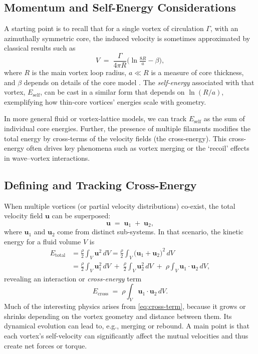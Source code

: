 \subsection{Momentum and Self-Energy Considerations}
\label{sec:momentum}
A starting point is to recall that for a single vortex of circulation $\Gamma$, with an
azimuthally symmetric core, the induced velocity is sometimes approximated by
classical results such as
\begin{equation}
   V \;=\; \frac{\Gamma}{4 \pi R}
   \bigl(\ln \tfrac{8 R}{a} - \beta \bigr),
\end{equation}
where $R$ is the main vortex loop radius, $a \ll R$ is a measure of core thickness,
and $\beta$ depends on details of the core model \cite{Saffman1992}. The
\emph{self-energy} associated with that vortex, $E_{\text{self}}$, can be cast in a
similar form that depends on $\ln(R/a)$, exemplifying how thin-core vortices'
energies scale with geometry.

In more general fluid or vortex-lattice models, we can track $E_{\text{self}}$ as the
sum of individual core energies. Further, the presence of multiple filaments modifies
the total energy by cross-terms of the velocity fields (the cross-energy). This
cross-energy often drives key phenomena such as vortex merging or the `recoil'
effects in wave--vortex interactions.

\subsection{Defining and Tracking Cross-Energy}
\label{sec:cross}
When multiple vortices (or partial velocity distributions) co-exist, the total velocity
field $\mathbf{u}$ can be superposed:
\begin{equation}
   \mathbf{u} \;=\; \mathbf{u}_1 \;+\;\mathbf{u}_2,
\end{equation}
where $\mathbf{u}_1$ and $\mathbf{u}_2$ come from distinct sub-systems. In that
scenario, the kinetic energy for a fluid volume $V$ is
\begin{align}
   E_{\text{total}} &= \frac{\rho}{2} \int_V \mathbf{u}^2 \,dV
   = \frac{\rho}{2} \int_V \bigl(\mathbf{u}_1 + \mathbf{u}_2 \bigr)^2\, dV \\
   &= \frac{\rho}{2} \int_V \mathbf{u}_1^2 \,dV \;+\;\frac{\rho}{2} \int_V \mathbf{u}_2^2 \, dV
   \;+\;\rho \int_V \mathbf{u}_1 \cdot \mathbf{u}_2 \, dV,
\end{align}
revealing an interaction or \emph{cross-energy} term
\begin{equation}
   E_{\text{cross}} \;=\; \rho \int_V \mathbf{u}_1 \cdot \mathbf{u}_2 \, dV.
   \label{eq:cross-term}
\end{equation}
Much of the interesting physics arises from \eqref{eq:cross-term}, because it
grows or shrinks depending on the vortex geometry and distance between them.
Its dynamical evolution can lead to, e.g., merging or rebound. A main point is that
each vortex's self-velocity can significantly affect the mutual velocities and thus
create net forces or torque.

